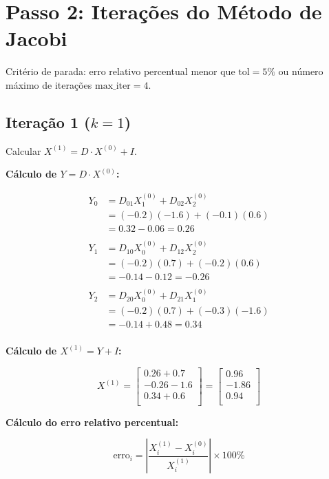 \documentclass{article}
\begin{document}
\section*{Passo 2: Iterações do Método de Jacobi}

Critério de parada: erro relativo percentual menor que $\text{tol} = 5\%$ ou número máximo de iterações $\text{max\_iter} = 4$.

\subsection*{Iteração 1 ($k = 1$)}

Calcular $X^{(1)} = D \cdot X^{(0)} + I$.

\textbf{Cálculo de $Y = D \cdot X^{(0)}$:}

\begin{align*}
Y_0 &= D_{01} X^{(0)}_1 + D_{02} X^{(0)}_2 \\
&= (-0.2)(-1.6) + (-0.1)(0.6) \\
&= 0.32 - 0.06 = 0.26 \\
\\
Y_1 &= D_{10} X^{(0)}_0 + D_{12} X^{(0)}_2 \\
&= (-0.2)(0.7) + (-0.2)(0.6) \\
&= -0.14 - 0.12 = -0.26 \\
\\
Y_2 &= D_{20} X^{(0)}_0 + D_{21} X^{(0)}_1 \\
&= (-0.2)(0.7) + (-0.3)(-1.6) \\
&= -0.14 + 0.48 = 0.34 \\
\end{align*}

\textbf{Cálculo de $X^{(1)} = Y + I$:}

\[
X^{(1)} = \begin{bmatrix}
0.26 + 0.7 \\
-0.26 - 1.6 \\
0.34 + 0.6 \\
\end{bmatrix} = \begin{bmatrix}
0.96 \\
-1.86 \\
0.94 \\
\end{bmatrix}
\]

\textbf{Cálculo do erro relativo percentual:}

\[
\text{erro}_i = \left| \dfrac{X^{(1)}_i - X^{(0)}_i}{X^{(1)}_i} \right| \times 100\%
\]
\end{document}
